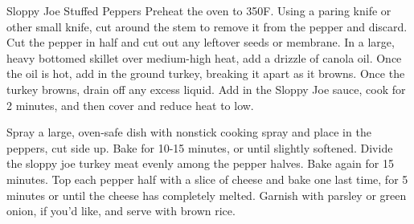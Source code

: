 \begin{recipe}{Sloppy Joe Stuffed Peppers}{}{}
  Preheat the oven to 350\degrees F.  Using a paring knife or other small knife,
  cut around the stem to remove it from the pepper and discard.  Cut the pepper
  in half and cut out any leftover seeds or membrane.
  In a large, heavy bottomed skillet over medium-high heat, add a drizzle of
  canola oil. Once the oil is hot, add in the ground turkey, breaking it apart
  as it browns.
  Once the turkey browns, drain off any excess liquid. Add in the Sloppy Joe
  sauce, cook for 2 minutes, and then cover and reduce heat to low.

  Spray a large, oven-safe dish with nonstick cooking spray and place in the
  peppers, cut side up. Bake for 10-15 minutes, or until slightly softened.
  \newstep
  Divide the sloppy joe turkey meat evenly among the pepper halves. Bake again
  for 15 minutes. \newstep
  Top each pepper half with a slice of cheese and bake one last time, for 5
  minutes or until the cheese has completely melted. Garnish with parsley or
  green onion, if you'd like, and serve with brown rice. 
\end{recipe}
